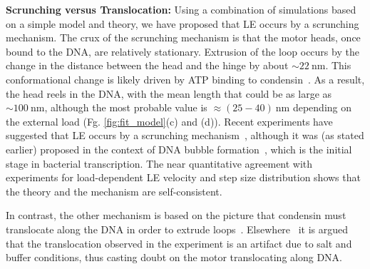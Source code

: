 \documentclass[fleqn,10pt]{wlscirep}
\newcommand{\nm}{\ \mathrm{nm}}
\begin{document}
{\bf Scrunching versus Translocation:} Using a combination of simulations based on a simple model and theory, we have proposed that LE occurs by a scrunching mechanism. The crux of the scrunching mechanism is that the motor heads, once bound to the DNA, are relatively stationary. Extrusion of the loop occurs by the change in the distance between the head and the hinge by about $\sim 22\nm$. This conformational change is likely driven by ATP binding to condensin~\cite{ryu2020resolving}.  As a result, the head reels in the DNA, with the mean length that could be as large as $\sim 100 \nm$, although the most probable value is $\approx (25-40) \nm$ depending on the external load (Fg. \ref{fig:fit_model}(c) and (d)). Recent experiments have suggested that LE occurs by a scrunching mechanism~\cite{ryu2020resolving}, although it was (as stated earlier) proposed in the context of DNA bubble formation~\cite{kapanidis2006initial}, which is the initial stage in bacterial transcription. The near quantitative agreement with experiments for load-dependent LE velocity and step size distribution shows that the theory and the mechanism are self-consistent. 

In contrast, the other mechanism is based on the picture that condensin must translocate along the DNA in order to extrude loops~\cite{banigan2019limits}. Elsewhere~\cite{ganji2018real} it is argued that the translocation observed in the experiment is an artifact due to salt and buffer conditions, thus casting doubt on the motor translocating along DNA.%
\end{document}
